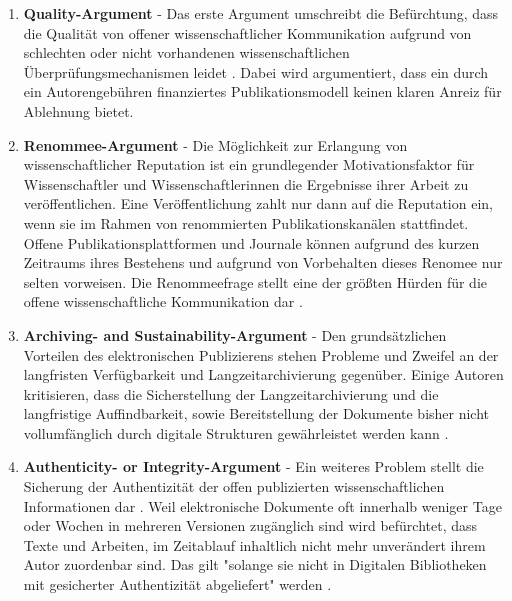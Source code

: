 \begin{enumerate}
\item \textbf{Quality-Argument} - Das erste Argument umschreibt die Befürchtung, dass die Qualität von offener wissenschaftlicher Kommunikation aufgrund von schlechten oder nicht vorhandenen wissenschaftlichen Überprüfungsmechanismen leidet \cite{Chibnik_2015} \cite{Beall_2012}. Dabei wird argumentiert, dass ein durch ein Autorengebühren finanziertes Publikationsmodell keinen klaren Anreiz für Ablehnung bietet.
\item \textbf{Renommee-Argument} - Die Möglichkeit zur Erlangung von wissenschaftlicher Reputation ist ein grundlegender Motivationsfaktor für Wissenschaftler und Wissenschaftlerinnen die Ergebnisse ihrer Arbeit zu veröffentlichen. Eine Veröffentlichung zahlt nur dann auf die Reputation ein, wenn sie im Rahmen von renommierten Publikationskanälen stattfindet. Offene Publikationsplattformen und Journale können aufgrund des kurzen Zeitraums ihres Bestehens und aufgrund von Vorbehalten dieses Renomee nur selten vorweisen. Die Renommeefrage stellt eine der größten Hürden für die offene wissenschaftliche Kommunikation dar \cite{weishaupt_2009_goldenOA}.
\item \textbf{Archiving- and Sustainability-Argument} - Den grundsätzlichen Vorteilen des elektronischen Publizierens stehen Probleme und Zweifel an der langfristen Verfügbarkeit und Langzeitarchivierung \cite{weishaupt_2009_goldenOA} gegenüber. Einige Autoren kritisieren, dass die Sicherstellung der Langzeitarchivierung und die langfristige Auffindbarkeit, sowie Bereitstellung der Dokumente bisher nicht vollumfänglich durch digitale Strukturen gewährleistet werden kann \cite{umstatter_2007_qualitatssicherung} \cite{Gersmann_2007}.
\item \textbf{Authenticity- or Integrity-Argument} - Ein weiteres Problem stellt die Sicherung der Authentizität der offen publizierten wissenschaftlichen Informationen dar \cite{umstatter_2007_qualitatssicherung} \cite{weishaupt_2009_goldenOA} \cite{grand_2012_open}. Weil elektronische Dokumente oft innerhalb weniger Tage oder Wochen in mehreren Versionen zugänglich sind wird befürchtet, dass Texte und Arbeiten, im Zeitablauf inhaltlich nicht mehr unverändert ihrem Autor zuordenbar sind. Das gilt "solange sie nicht in Digitalen Bibliotheken mit gesicherter Authentizität abgeliefert" werden \cite{umstatter_2007_qualitatssicherung}.

\end{enumerate}
